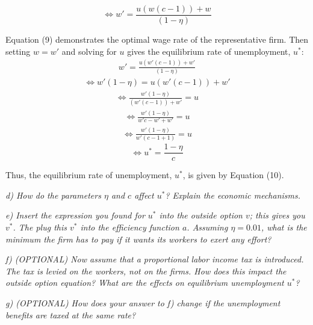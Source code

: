 \documentclass[11pt]{article} %
\begin{document}
\begin{equation}
   \Longleftrightarrow w' = \frac{u\left(w(c-1)\right) + w} {(1 - \eta)}
\end{equation}

\bigskip
Equation (9) demonstrates the optimal wage rate of the representative firm. Then setting $w=w'$ and solving for $u$ gives the equilibrium rate of unemployment, $u^*$:
\begin{align*}
    w' = \frac{u\left(w'(c-1)\right) + w'} {(1 - \eta)}
\end{align*}
\begin{align*}
   \Longleftrightarrow w'(1 - \eta) = {u\left(w'(c-1)\right) + w'} 
\end{align*}
\begin{align*}
    \Longleftrightarrow \frac {w'(1 -\eta)} {\left(w'(c-1)\right) + w'} = {u} 
\end{align*}
\begin{align*}
    \Longleftrightarrow \frac {w'(1 -\eta)} {w'c-w' + w'} = {u} 
\end{align*}
\begin{align*}
    \Longleftrightarrow \frac {w'(1 -\eta)} {w'(c-1+1)} = {u} 
\end{align*}
\begin{equation}
    \Longleftrightarrow u^* = \frac {1 -\eta} {c}
\end{equation}

\bigskip
Thus, the equilibrium rate of unemployment, $u^*$, is given by Equation (10).



\pagebreak
\textit{d) How do the parameters $\eta$ and $c$ affect $u^*$? Explain the economic mechanisms.}




\pagebreak
\textit{e) Insert the expression you found for $u^*$ into the outside option $v$; this
gives you $v^*$. The plug this $v^*$ into the efficiency function $a$. Assuming
$\eta=0.01$, what is the minimum the firm has to pay if it wants its
workers to exert any effort?}




\pagebreak
\textit{f) (OPTIONAL) Now assume that a proportional labor income tax is
introduced. The tax is levied on the workers, not on the firms. How
does this impact the outside option equation? What are the effects on
equilibrium unemployment $u^*$?}




\pagebreak
\textit{g) (OPTIONAL) How does your answer to f) change if the unemployment
benefits are taxed at the same rate?}
\end{document}
